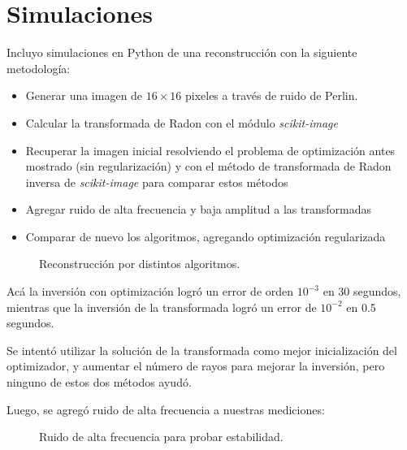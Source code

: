 \section{Simulaciones}
Incluyo simulaciones en Python de una reconstrucción con la siguiente metodología:
\begin{itemize}
    \item Generar una imagen de $16\times 16$ pixeles a través de ruido de Perlin.
    \item Calcular la transformada de Radon con el módulo \textit{scikit-image} \citep{scikit-image}
    \item Recuperar la imagen inicial resolviendo el problema de optimización antes mostrado (sin regularización) y con el método de transformada de Radon inversa de \textit{scikit-image} para comparar estos métodos
    \item Agregar ruido de alta frecuencia y baja amplitud a las transformadas
    \item Comparar de nuevo los algoritmos, agregando optimización regularizada
\end{itemize}
\begin{figure}\centering
{}\hfill 
{}
\label{fig}
\end{figure}
\begin{figure}\centering
{}\hfill
{}
\caption{Reconstrucción por distintos algoritmos.}
\label{fig}
\end{figure}

Acá la inversión con optimización logró un error de orden $10^{-3}$ en 30 segundos, mientras que la inversión de la transformada logró un error de $10^{-2}$ en 0.5 segundos.

Se intentó utilizar la solución de la transformada como mejor inicialización del optimizador, y aumentar el número de rayos para mejorar la inversión, pero ninguno de estos dos métodos ayudó.

Luego, se agregó ruido de alta frecuencia a nuestras mediciones:
\begin{figure}\centering
{}\hfill
{}
\caption{Ruido de alta frecuencia para probar estabilidad.}
\label{fig}
\end{figure}

